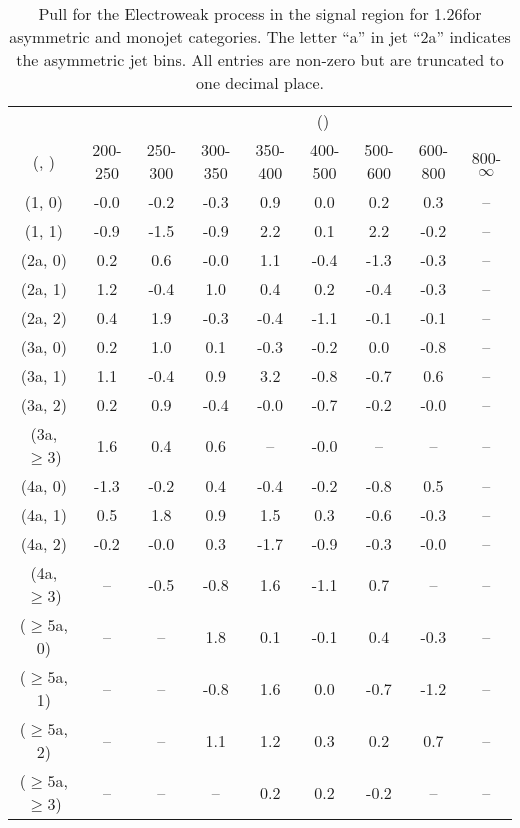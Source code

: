 \begin{table}[h!]
\tiny
\centering
\caption{Pull for the Electroweak process in the signal region for 1.26\ifb for asymmetric and monojet categories. The letter ``a'' in jet \eg ``2a''  indicates the asymmetric jet bins. All entries are non-zero but are truncated to one decimal place.\label{tab:pullsep_sig_ewk_asym}}
\begin{tabular}
{ccccccccc}
	\hline\hline
&	& \multicolumn{8}{c}{\scalht (\gev)} \\ 
	 (\njet,  \nb) & 200-250 & 250-300 & 300-350 & 350-400 & 400-500 & 500-600 & 600-800 & 800-$\infty$ \\ [0.8ex] 
\hline
	(1, 0) & -0.0 & -0.2 & -0.3 & 0.9 & 0.0 & 0.2 & 0.3 & -- \\[0.5ex] 
	(1, 1) & -0.9 & -1.5 & -0.9 & 2.2 & 0.1 & 2.2 & -0.2 & -- \\[0.5ex] 
	(2a, 0) & 0.2 & 0.6 & -0.0 & 1.1 & -0.4 & -1.3 & -0.3 & -- \\[0.5ex] 
	(2a, 1) & 1.2 & -0.4 & 1.0 & 0.4 & 0.2 & -0.4 & -0.3 & -- \\[0.5ex] 
	(2a, 2) & 0.4 & 1.9 & -0.3 & -0.4 & -1.1 & -0.1 & -0.1 & -- \\[0.5ex] 
	(3a, 0) & 0.2 & 1.0 & 0.1 & -0.3 & -0.2 & 0.0 & -0.8 & -- \\[0.5ex] 
	(3a, 1) & 1.1 & -0.4 & 0.9 & 3.2 & -0.8 & -0.7 & 0.6 & -- \\[0.5ex] 
	(3a, 2) & 0.2 & 0.9 & -0.4 & -0.0 & -0.7 & -0.2 & -0.0 & -- \\[0.5ex] 
	(3a, $\ge3$) & 1.6 & 0.4 & 0.6 & -- & -0.0 & -- & -- & -- \\[0.5ex] 
	(4a, 0) & -1.3 & -0.2 & 0.4 & -0.4 & -0.2 & -0.8 & 0.5 & -- \\[0.5ex] 
	(4a, 1) & 0.5 & 1.8 & 0.9 & 1.5 & 0.3 & -0.6 & -0.3 & -- \\[0.5ex] 
	(4a, 2) & -0.2 & -0.0 & 0.3 & -1.7 & -0.9 & -0.3 & -0.0 & -- \\[0.5ex] 
	(4a, $\ge3$) & -- & -0.5 & -0.8 & 1.6 & -1.1 & 0.7 & -- & -- \\[0.5ex] 
	($\ge5$a, 0) & -- & -- & 1.8 & 0.1 & -0.1 & 0.4 & -0.3 & -- \\[0.5ex] 
	($\ge5$a, 1) & -- & -- & -0.8 & 1.6 & 0.0 & -0.7 & -1.2 & -- \\[0.5ex] 
	($\ge5$a, 2) & -- & -- & 1.1 & 1.2 & 0.3 & 0.2 & 0.7 & -- \\[0.5ex] 
	($\ge5$a, $\ge3$) & -- & -- & -- & 0.2 & 0.2 & -0.2 & -- & -- \\[0.5ex] 
	\hline
	\hline
\end{tabular}
\end{table}
